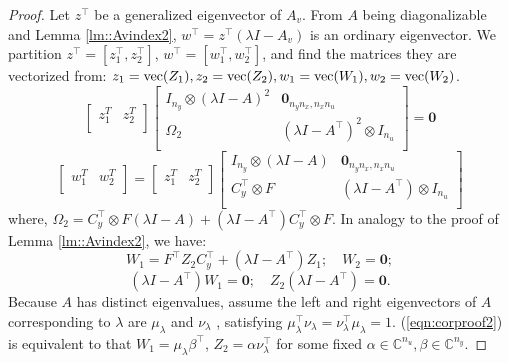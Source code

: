 \begin{proof}
Let \(z^\top\) be a generalized eigenvector of \(A_v\). From \(A\) being diagonalizable and Lemma \ref{lm::Avindex2}, \(w^\top = z^\top(\lambda I- A_v)\) is an ordinary eigenvector.
We partition \(z^\top =[z_{1}^\top,z_{2}^\top]\), \(w^\top =[w_{1}^\top,w_{2}^\top]\), and find the matrices they are vectorized from: \(z_1 = {\mathrm{vec}}(Z_1), z_2 = {\mathrm{vec}}(Z_2), w_{1} =  {\mathrm{vec}}(W_1), w_2 = {\mathrm{vec}}(W_2)\).
\begin{equation*}
    \left[
\begin{array}{cc}
    z_1^T & z_2^T \\
\end{array}\right]
\left[
\begin{array}{cc}
    I_{n_y}\otimes (\lambda I -A)^2 & \mathbf{0}_{n_y n_x,n_x n_u} \\
  \Omega_2 & (\lambda I -A^\top)^2\otimes I_{n_u}\\
\end{array}\right] = \mathbf{0}
\end{equation*}
\begin{equation*}
\left[
\begin{array}{cc}
    w_1^T & w_2^T \\
\end{array}\right]=\left[
\begin{array}{cc}
    z_1^T & z_2^T \\
\end{array}\right]
\left[
\begin{array}{cc}
    I_{n_y}\otimes (\lambda I -A) & \mathbf{0}_{n_y n_x,n_x n_u} \\
   C_y^\top \otimes F & (\lambda I -A^\top)\otimes I_{n_u}\\
\end{array}\right] 
\end{equation*}
where, \(\Omega_2 = C_y^\top \otimes F (\lambda I -A)+(\lambda I -A^\top)C_y^\top\otimes F\).
In analogy to the proof of Lemma \ref{lm::Avindex2}, we have:
\begin{equation}\label{eqn:corproof1}
W_1 = F^\top Z_2 C_y^\top + (\lambda I -A^\top) Z_1;\quad W_2 = \mathbf{0};
\end{equation}
\begin{equation}\label{eqn:corproof2}
    (\lambda I -A^\top) W_1 = \mathbf{0};\quad Z_2(\lambda I -A^\top)= \mathbf{0}.
\end{equation}
Because \(A\) has distinct eigenvalues, assume the left and right eigenvectors of \(A\) corresponding to \(\lambda\) are \(\mu_\lambda\) and \(\nu_\lambda\)
, satisfying \(\mu_\lambda^\top \nu_\lambda = \nu_\lambda^\top \mu_\lambda =1\). (\ref{eqn:corproof2}) is equivalent to that \(W_1 = \mu_\lambda \beta^\top\), \(Z_2 = \alpha \nu_\lambda^\top\) for some fixed \(\alpha \in \mathbb{C}^{n_u}, \beta \in \mathbb{C}^{n_y}\).


\end{proof}
